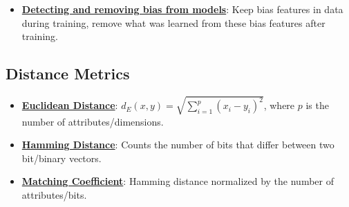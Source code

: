 \documentclass{article}%
\begin{document}
\begin{itemize}[leftmargin=*]
\item \href{https://purdue.brightspace.com/d2l/common/assets/pdfjs-d2l-dist/1.0.14-legacy/web/viewer.html?file=\%2Fcontent\%2Fenforced\%2F1095467-wl.202510.CS.24300.001\%2F16L2-ethics.pdf\%3Fou\%3D1095467\&lang=en-us\&container=d2l-fileviewer-rendered-pdf\&fullscreen=d2l-fileviewer-rendered-pdf-dialog\&height=667#page=34}{\textbf{Detecting and removing bias from models}}: Keep bias features in data during training, remove what was learned from these bias features after training.%
\end{itemize}

%
\subsection{Distance Metrics}%
\label{subsec:DistanceMetrics}%
\begin{itemize}[leftmargin=*]%
\item \href{https://purdue.brightspace.com/d2l/common/assets/pdfjs-d2l-dist/1.0.14-legacy/web/viewer.html?file=\%2Fcontent\%2Fenforced\%2F1095467-wl.202510.CS.24300.001\%2F12L2-distance-clusters.pdf\%3Fou\%3D1095467\&lang=en-us\&container=d2l-fileviewer-rendered-pdf\&fullscreen=d2l-fileviewer-rendered-pdf-dialog\&height=667#page=17}{\textbf{Euclidean Distance}}: $d_E(x, y) = \sqrt{\sum_{i=1}^{p} (x_i - y_i)^2}$, where $p$ is the number of attributes/dimensions.%
\item \href{https://purdue.brightspace.com/d2l/common/assets/pdfjs-d2l-dist/1.0.14-legacy/web/viewer.html?file=\%2Fcontent\%2Fenforced\%2F1095467-wl.202510.CS.24300.001\%2F12L2-distance-clusters.pdf\%3Fou\%3D1095467\&lang=en-us\&container=d2l-fileviewer-rendered-pdf\&fullscreen=d2l-fileviewer-rendered-pdf-dialog\&height=667#page=19}{\textbf{Hamming Distance}}: Counts the number of bits that differ between two bit/binary vectors.%
\item \href{https://purdue.brightspace.com/d2l/common/assets/pdfjs-d2l-dist/1.0.14-legacy/web/viewer.html?file=\%2Fcontent\%2Fenforced\%2F1095467-wl.202510.CS.24300.001\%2F12L2-distance-clusters.pdf\%3Fou\%3D1095467\&lang=en-us\&container=d2l-fileviewer-rendered-pdf\&fullscreen=d2l-fileviewer-rendered-pdf-dialog\&height=667#page=19}{\textbf{Matching Coefficient}}: Hamming distance normalized by the number of attributes/bits.%
\end{itemize}

%
\end{document}
